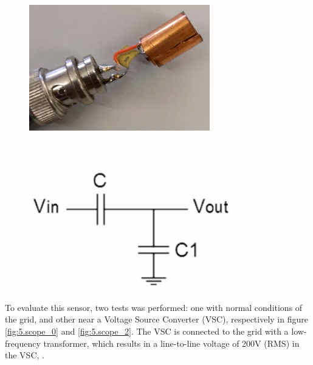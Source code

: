 	\begin{figure}[h!]
		\centering
		\begin{minipage}{.45\textwidth}
			\centering
			\includegraphics[width=0.7\textwidth,keepaspectratio]{figures/5.PreliminaryW/voltage_sensor}
			\label{fig:5.voltage_sensor}
		\end{minipage}%
		\begin{minipage}{.03\textwidth}  ~\end{minipage}	
		\begin{minipage}{.45\textwidth}
			\centering
			\includegraphics[width=0.8\textwidth,keepaspectratio]{figures/5.PreliminaryW/voltage_sensor_eq}
			\label{fig:5.voltage_sensor_eq}
		\end{minipage}
	\end{figure}

	
	To evaluate this sensor, two tests was performed: one with normal conditions of the grid, and other near a Voltage Source Converter (VSC), respectively in figure \ref{fig:5.scope_0} and \ref{fig:5.scope_2}. 
	The VSC is connected to the grid with a low-frequency transformer, which results in a line-to-line voltage of 200V (RMS) in the VSC, \cite{martins2016}.
	
